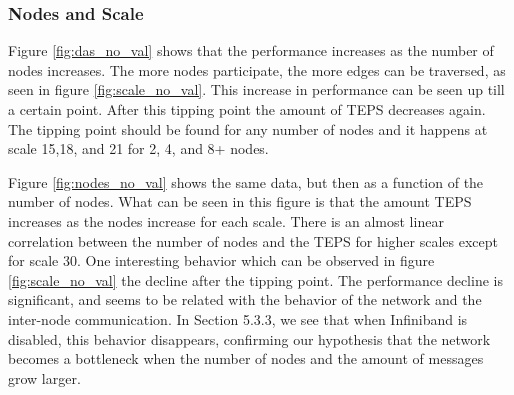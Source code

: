 \subsubsection{Nodes and Scale}
\label{res:nodes_scale}
Figure \ref{fig:das_no_val} shows that the performance increases as the number of nodes increases. The more nodes participate, the more edges can be traversed, as seen in figure \ref{fig:scale_no_val}. This increase in performance can be seen up till a certain point. After this tipping point the amount of TEPS decreases again. The tipping point should be found for any number of nodes and it happens at scale 15,18, and 21 for 2, 4, and 8+ nodes. 

Figure \ref{fig:nodes_no_val} shows the same data, but then as a function of the number of nodes. What can be seen in this figure is that the amount TEPS increases as the nodes increase for each scale. There is an almost linear correlation between the number of nodes and the TEPS for higher scales except for scale 30. One interesting behavior which can be observed in figure \ref{fig:scale_no_val} the decline after the tipping point. The performance decline is significant, and seems to be related with the behavior of the network and the inter-node communication. In Section 5.3.3, we see that when Infiniband is disabled, this behavior disappears, confirming our hypothesis that the network becomes a bottleneck when the number of nodes and the amount of messages grow larger.

